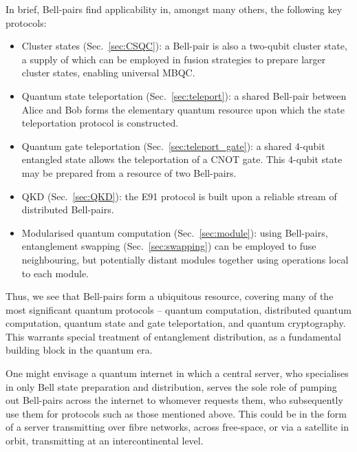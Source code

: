 \documentclass[aps,rmp,twocolumn,amsmath,amssymb,nofootinbib,superscriptaddress,longbibliography,floatfix,table-of-contents,eqsecnum]{revtex4-1}
\begin{document}
In brief, Bell-pairs find applicability in, amongst many others, the following key protocols:
\begin{itemize}
\item Cluster states (Sec.~\ref{sec:CSQC}): a Bell-pair is also a two-qubit cluster state, a supply of which can be employed in fusion strategies to prepare larger cluster states, enabling universal MBQC.
\item Quantum state teleportation (Sec.~\ref{sec:teleport}): a shared Bell-pair between Alice and Bob forms the elementary quantum resource upon which the state teleportation protocol is constructed.
\item Quantum gate teleportation (Sec.~\ref{sec:teleport_gate}): a shared 4-qubit entangled state allows the teleportation of a CNOT gate. This 4-qubit state may be prepared from a resource of two Bell-pairs.
\item QKD (Sec.~\ref{sec:QKD}): the E91 protocol is built upon a reliable stream of distributed Bell-pairs.
\item Modularised quantum computation (Sec.~\ref{sec:module}): using Bell-pairs, entanglement swapping (Sec.~\ref{sec:swapping}) can be employed to fuse neighbouring, but potentially distant modules together using operations local to each module.
\end{itemize}

Thus, we see that Bell-pairs form a ubiquitous resource, covering many of the most significant quantum protocols -- quantum computation, distributed quantum computation, quantum state and gate teleportation, and quantum cryptography. This warrants special treatment of entanglement distribution, as a fundamental building block in the quantum era.

One might envisage a quantum internet in which a central server, who specialises in only Bell state preparation and distribution, serves the sole role of pumping out Bell-pairs across the internet to whomever requests them, who subsequently use them for protocols such as those mentioned above. This could be in the form of a server transmitting over fibre networks, across free-space, or via a satellite in orbit, transmitting at an intercontinental level.
\end{document}
